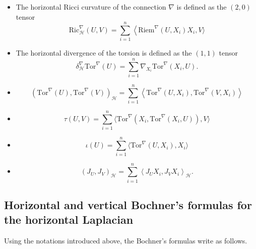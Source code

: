 \documentclass[11pt]{article}
\numberwithin{equation}{section}
\newcommand{\Ho}{\mathcal H}
\newcommand{\Tor}{\mathrm{Tor}}
\begin{document}
	\begin{itemize}
		\item The horizontal Ricci curvature of the connection $\nabla$ is defined as the $(2,0)$ tensor
		\[
		\mathrm{Ric}^\nabla_\Ho(U,V)=\sum_{i=1}^n  \left \langle \mathrm{Riem}^\nabla(U,X_i)X_i, V \right.\rangle
		\]
		\item The horizontal divergence of the torsion is defined as the $(1,1)$ tensor
		\[
		\delta^\nabla_\Ho \Tor^\nabla (U)= \sum_{i=1}^n \nabla_{X_i} \Tor^\nabla(X_i,U).
		\]
		\item
		\[
		(\Tor^\nabla(U) ,\Tor^\nabla(V))_\Ho=\sum_{i=1}^n \left\langle \Tor^\nabla (U,X_i), \Tor^\nabla (V,X_i)\right\rangle
		\]
        \item 
        \[
       \tau (U,V)=\sum_{i=1}^n \langle \Tor^\nabla(X_i, \Tor^{\nabla}(X_i, U) ), V  \rangle
        \]
        \item 
        \[
        \iota(U)=\sum_{i=1}^n \langle \Tor^\nabla(U,X_i),X_i \rangle
        \]
		\item 
		\[
		(J_U ,J_V)_\Ho=\sum_{i=1}^n \left\langle J_U X_i , J_V X_i \right\rangle_\Ho.
		\]
	\end{itemize}
	
	\subsection{Horizontal and vertical Bochner's formulas for the horizontal Laplacian}

    Using the notations introduced above, the Bochner's formulas write as follows.
    
\end{document}
